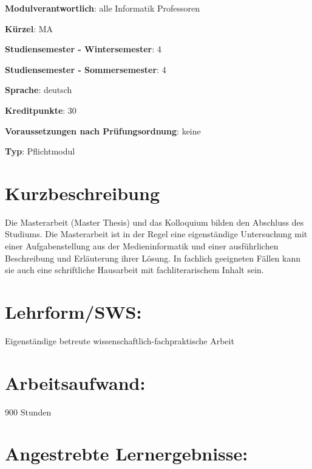 \begin{modulHead}
\textbf{Modulverantwortlich}: alle Informatik
Professoren
\end{modulHead}
\begin{modulHead}
\textbf{Kürzel}:
MA
\end{modulHead}
\begin{modulHead}
\textbf{Studiensemester -
Wintersemester}:
4
\end{modulHead}
\begin{modulHead}
\textbf{Studiensemester -
Sommersemester}: 4
\end{modulHead}
\begin{modulHead}
\textbf{Sprache}:
deutsch
\end{modulHead}
\begin{modulHead}
\textbf{Kreditpunkte}:
30
\end{modulHead}
\begin{modulHead}
\textbf{Voraussetzungen nach
Prüfungsordnung}: keine
\end{modulHead}
\begin{modulHead}
\textbf{Typ}:
Pflichtmodul
\end{modulHead}


\section*{Kurzbeschreibung}\label{kurzbeschreibung}

Die Masterarbeit (Master Thesis) und das Kolloquium bilden den Abschluss
des Studiums. Die Masterarbeit ist in der Regel eine eigenständige
Untersuchung mit einer Aufgabenstellung aus der Medieninformatik und
einer ausführlichen Beschreibung und Erläuterung ihrer Lösung. In
fachlich geeigneten Fällen kann sie auch eine schriftliche Hausarbeit
mit fachliterarischem Inhalt sein.

\section*{Lehrform/SWS:}\label{lehrformsws-1}

Eigenständige betreute wissenschaftlich-fachpraktische Arbeit

\section*{Arbeitsaufwand:}\label{arbeitsaufwand-1}

900 Stunden

\section*{Angestrebte
Lernergebnisse:}\label{angestrebte-lernergebnisse-1}

